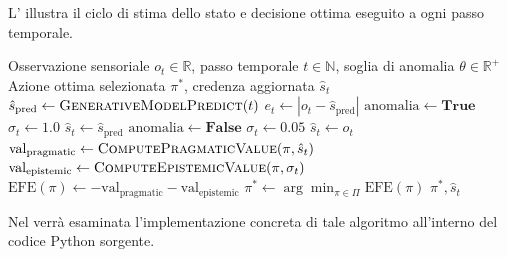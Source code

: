 L' illustra il ciclo di stima dello stato e decisione ottima eseguito a ogni passo temporale.

\begin{algorithm}[htbp]
\caption{Ciclo decisionale del controllore Active Inference.}
\label{alg:decision-process}
\begin{algorithmic}[1]
    \Require Osservazione sensoriale $o_t \in \mathbb{R}$, passo temporale $t \in \mathbb{N}$, soglia di anomalia $\theta \in \mathbb{R}^+$
    \Ensure Azione ottima selezionata $\pi^*$, credenza aggiornata $\hat{s}_t$
    \vspace{0.15cm}
    \State $\hat{s}_{\mathrm{pred}} \gets \Call{GenerativeModelPredict}{t}$ 
    \State $e_t \gets |o_t - \hat{s}_{\mathrm{pred}}|$ 
        \State $\mathrm{anomalia} \gets \mathbf{True}$
        \State $\sigma_t \gets 1.0$ 
        \State $\hat{s}_t \gets \hat{s}_{\mathrm{pred}}$ 
    \Else
        \State $\mathrm{anomalia} \gets \mathbf{False}$
        \State $\sigma_t \gets 0.05$ 
        \State $\hat{s}_t \gets o_t$ 
    \EndIf
        \State $\mathrm{val}_{\mathrm{pragmatic}} \gets \Call{ComputePragmaticValue}{\pi, \hat{s}_t}$
        \State $\mathrm{val}_{\mathrm{epistemic}} \gets \Call{ComputeEpistemicValue}{\pi, \sigma_t}$
        \State $\mathrm{EFE}(\pi) \gets -\mathrm{val}_{\mathrm{pragmatic}} - \mathrm{val}_{\mathrm{epistemic}}$
    \EndFor
    \State $\pi^* \gets \arg\min_{\pi \in \Pi} \mathrm{EFE}(\pi)$ 
    \State \Return $\pi^*, \hat{s}_t$
\end{algorithmic}
\end{algorithm}

Nel  verrà esaminata l'implementazione concreta di tale algoritmo all'interno del codice Python sorgente.
